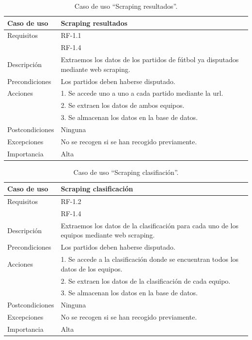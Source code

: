  \begin{table}
  \begin{center}
   \begin{tabular}{|p{3cm} | p{9cm} |}
    \hline
    Caso de uso & Scraping resultados\\
    \hline
    Requisitos & RF-1.1\\
    & RF-1.4\\
    \hline
    Descripción & Extraemos los datos de los partidos de fútbol ya disputados mediante web scraping.\\
    \hline
    Precondiciones &Los partidos deben haberse disputado.\\
    \hline
    Acciones & 1. Se accede uno a uno a cada partido mediante la url. \\
    &2. Se extraen los datos de ambos equipos.\\
    &3. Se almacenan los datos en la base de datos.\\
    \hline
    Postcondiciones & Ninguna \\
    \hline
    Excepciones & No se recogen si se han recogido previamente.\\
    \hline
    Importancia & Alta \\
    \hline
   \end{tabular}
   \caption{Caso de uso ``Scraping resultados''.}
   \label{tabla:casoUso1.1}
  \end{center}
 \end{table} 
 
\begin{table}
  \begin{center}
   \begin{tabular}{|p{3cm} | p{9cm} |}
    \hline
    Caso de uso & Scraping clasificación\\
    \hline
    Requisitos & RF-1.2\\
    & RF-1.4\\
    \hline
    Descripción & Extraemos los datos de la clasificación para cada uno de los equipos mediante web scraping.\\
    \hline
    Precondiciones &Los partidos deben haberse disputado.\\
    \hline
  	Acciones & 1. Se accede a la clasificación donde se encuentran todos los datos de los equipos. \\
    &2. Se extraen los datos de la clasificación de cada equipo.\\
    &3. Se almacenan los datos en la base de datos.\\
    \hline
    Postcondiciones & Ninguna \\
    \hline
    Excepciones & No se recogen si se han recogido previamente.\\
    \hline
    Importancia & Alta \\
    \hline
   \end{tabular}
   \caption{Caso de uso ``Scraping clasifiación''.}
   \label{tabla:casoUso1.2}
  \end{center}
 \end{table} 

